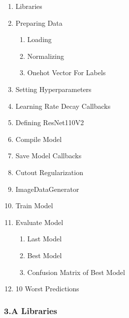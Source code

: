 \documentclass[11pt]{article}
\providecommand{\tightlist}{%
      \setlength{\itemsep}{0pt}\setlength{\parskip}{0pt}}
\begin{document}
\begin{enumerate}
\def\labelenumi{\arabic{enumi}.}
\tightlist
\item
  Libraries
\item
  Preparing Data

  \begin{enumerate}
  \def\labelenumii{\arabic{enumii}.}
  \tightlist
  \item
    Loading
  \item
    Normalizing
  \item
    Onehot Vector For Labels
  \end{enumerate}
\item
  Setting Hyperparameters
\item
  Learning Rate Decay Callbacks
\item
  Defining ResNet110V2
\item
  Compile Model
\item
  Save Model Callbacks
\item
  Cutout Regularization
\item
  ImageDataGenerator
\item
  Train Model
\item
  Evaluate Model

  \begin{enumerate}
  \def\labelenumii{\arabic{enumii}.}
  \tightlist
  \item
    Last Model
  \item
    Best Model
  \item
    Confusion Matrix of Best Model
  \end{enumerate}
\item
  10 Worst Predictions
\end{enumerate}

    \hypertarget{a-libraries}{%
\subsubsection{3.A Libraries}\label{a-libraries}}
\end{document}

